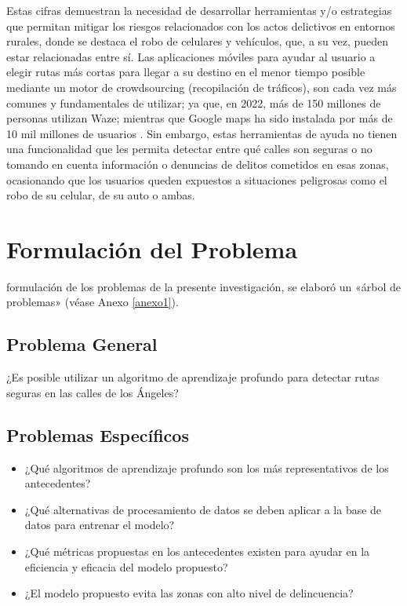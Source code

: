 Estas cifras demuestran la necesidad de desarrollar herramientas y/o estrategias que permitan mitigar los riesgos relacionados con los actos delictivos en entornos rurales, donde se destaca el robo de celulares y vehículos, que, a su vez, pueden estar relacionadas entre sí. Las aplicaciones móviles para ayudar al usuario a elegir rutas más cortas para llegar a su destino en el menor tiempo posible mediante un motor de crowdsourcing (recopilación de tráficos), son cada vez más comunes y fundamentales de utilizar; ya que, en 2022, más de 150 millones de personas utilizan Waze; mientras que Google maps ha sido instalada por más de 10 mil millones de usuarios \parencite{cu_luishernan}. Sin embargo, estas herramientas de ayuda no tienen una funcionalidad que les permita detectar entre qué calles son seguras o no tomando en cuenta información o denuncias de delitos cometidos en esas zonas, ocasionando que los usuarios queden expuestos a situaciones peligrosas como el robo de su celular, de su auto o ambas. 



\section{Formulación del Problema}

 formulación de los problemas de la presente investigación, se elaboró un «árbol de problemas» (véase Anexo \ref{anexo1}). 

\subsection{Problema General}
\newcommand{\ProblemaGeneral}{
	¿Es posible utilizar un algoritmo de aprendizaje profundo para detectar rutas seguras en las calles de los Ángeles? 
}
\ProblemaGeneral
\subsection{Problemas Espec\'{i}ficos}
\newcommand{\Pbone}{
¿Qué algoritmos de aprendizaje profundo son los más representativos de los antecedentes?
}
\newcommand{\Pbtwo}{
¿Qué alternativas de procesamiento de datos se deben aplicar a la base de datos para entrenar el modelo?
}
\newcommand{\Pbthree}{
¿Qué métricas propuestas en los antecedentes existen para ayudar en la eficiencia y eficacia del modelo propuesto?
}
\newcommand{\Pbfour}{
¿El modelo propuesto evita las zonas con alto nivel de delincuencia?
}

\begin{itemize}
	\item \Pbone
	\item \Pbtwo
	\item \Pbthree
	\item \Pbfour
\end{itemize}

